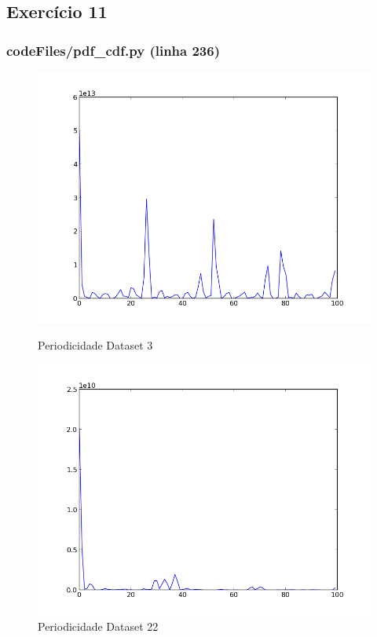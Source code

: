 \documentclass[pdftex,12pt,a4paper]{report}
\begin{document}
\subsection{Exercício 11}
\subsubsection{codeFiles/pdf\_cdf.py (linha 236)}

\begin{figure}[!htb]
  \centering
  \begin{minipage}[b]{0.4\textwidth}
    \includegraphics[width=\textwidth]{periodicity/periodicity_service_3.png}
    \caption{Periodicidade Dataset 3}
    \label{fig:periodicity_3}
  \end{minipage}
  \hfill
  \begin{minipage}[b]{0.4\textwidth}
    \includegraphics[width=\textwidth]{periodicity/periodicity_service_22.png}
    \caption{Periodicidade Dataset 22}
    \label{fig:periodicity_22}
  \end{minipage}
\end{figure}
\end{document}
